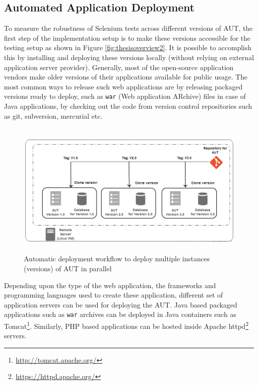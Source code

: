 \subsection{Automated Application Deployment}
\label{sec:autoDeployment}




To measure the robustness of Selenium tests across different versions of AUT, the first step of the implementation setup is to make these versions accessible for the testing setup as shown in Figure \ref{fig:thesisoverview2}. It is possible to accomplish this by installing and deploying these versions locally (without relying on external application server provider). Generally, most of the open-source application vendors make older versions of their applications available for public usage. The most common ways to release such web applications are by releasing packaged versions ready to deploy, such as \texttt{war} (Web application ARchive) files in case of Java applications, by checking out the code from version control repositories such as git, subversion, mercurial etc.

\begin{figure}[h]
\makeatletter 
\makeatother
    \centering
  \includegraphics[width=5.4in,height=2.6in]{./Figures/Deployment_Process_2.jpg}
  \captionsetup{justification=raggedright,
singlelinecheck=false
}
  \caption{Automatic deployment workflow to deploy multiple instances (versions) of AUT in parallel}
  \label{fig:deployment} 
\end{figure}

Depending upon the type of the web application, the frameworks and programming languages used to create these application, different set of application servers can be used for deploying the AUT. Java based packaged applications such as \texttt{war} archives can be deployed in Java containers such as Tomcat\footnote{\url{http://tomcat.apache.org/}}. Similarly, PHP based applications can be hosted inside Apache httpd\footnote{\url{https://httpd.apache.org/}} servers. 


